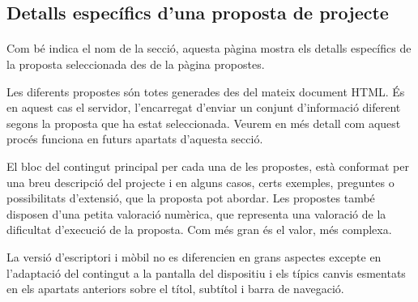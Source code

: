 \subsection{Detalls específics d'una proposta de projecte}

    \paragraph{}
    Com bé indica el nom de la secció, aquesta pàgina mostra els detalls específics de la proposta seleccionada des de la pàgina propostes.

    Les diferents propostes són totes generades des del mateix document HTML. És en aquest cas el servidor, l'encarregat d'enviar un conjunt d'informació diferent segons la proposta que ha estat seleccionada. Veurem en més detall com aquest procés funciona en futurs apartats d’aquesta secció.

    El bloc del contingut principal per cada una de les propostes, està conformat per una breu descripció del projecte i en alguns casos, certs exemples, preguntes o possibilitats d’extensió, que la proposta pot abordar. Les propostes també disposen d’una petita valoració numèrica, que representa una valoració de la dificultat d’execució de la proposta. Com més gran és el valor, més complexa.

    La versió d'escriptori i mòbil no es diferencien en grans aspectes excepte en l'adaptació del contingut a la pantalla del dispositiu i els típics canvis esmentats en els apartats anteriors sobre el títol, subtítol i barra de navegació.
